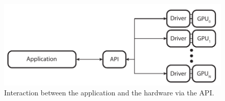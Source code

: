 


  \begin{figure}
    \centering
    \includegraphics[width=\textwidth]{Main/Images/Application_API_Driver_Overview}
    \caption{Interaction between the application and the hardware via the API.}
    \label{fig:AppApiDriverOverview}
  \end{figure}



